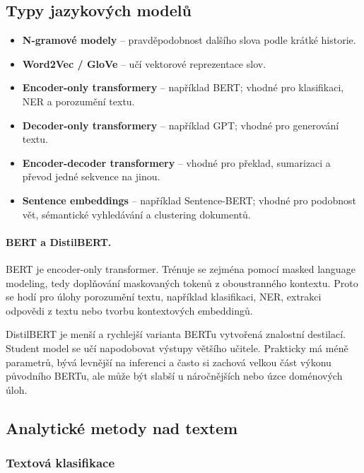\subsection{Typy jazykových modelů}

\begin{itemize}
    \item \textbf{N-gramové modely} -- pravděpodobnost dalšího slova podle krátké historie.
    
    \item \textbf{Word2Vec / GloVe} -- učí vektorové reprezentace slov.
    
    \item \textbf{Encoder-only transformery} -- například BERT; vhodné pro klasifikaci, NER a porozumění textu.
    
    \item \textbf{Decoder-only transformery} -- například GPT; vhodné pro generování textu.
    
    \item \textbf{Encoder-decoder transformery} -- vhodné pro překlad, sumarizaci a převod jedné sekvence na jinou.
    
    \item \textbf{Sentence embeddings} -- například Sentence-BERT; vhodné pro podobnost vět, sémantické vyhledávání
    a clustering dokumentů.
\end{itemize}

\paragraph{BERT a DistilBERT.}
BERT je encoder-only transformer. Trénuje se zejména pomocí masked language modeling, tedy doplňování
maskovaných tokenů z oboustranného kontextu. Proto se hodí pro úlohy porozumění textu, například
klasifikaci, NER, extrakci odpovědi z textu nebo tvorbu kontextových embeddingů.

DistilBERT je menší a rychlejší varianta BERTu vytvořená znalostní destilací. Student model se učí
napodobovat výstupy většího učitele. Prakticky má méně parametrů, bývá levnější na inferenci a často si
zachová velkou část výkonu původního BERTu, ale může být slabší u náročnějších nebo úzce doménových úloh.

\subsection{Analytické metody nad textem}

\subsubsection{Textová klasifikace}

